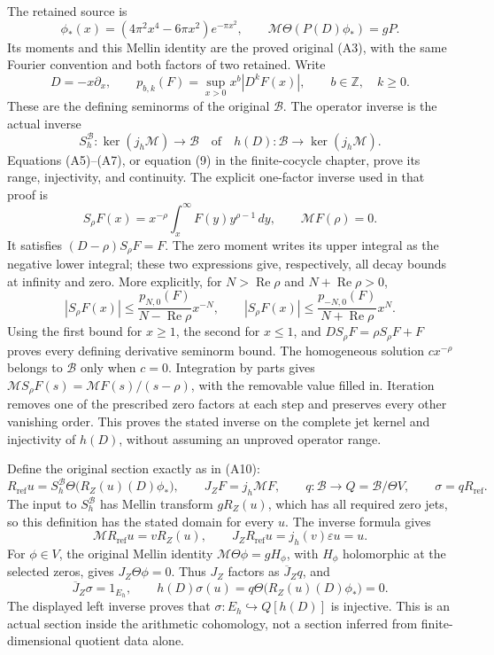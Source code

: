 \documentclass[10pt,a4paper,oneside]{report}
\begin{document}
The retained source is
\[
 \phi_*(x)=(4\pi^2x^4-6\pi x^2)e^{-\pi x^2},\qquad
 \mathcal M\Theta(P(D)\phi_*)=gP.
\]
Its moments and this Mellin identity are the proved original (A3), with
the same Fourier convention and both factors of two retained. Write
\[
 D=-x\partial_x,\qquad
 p_{b,k}(F)=\sup_{x>0}x^b|D^kF(x)|,
 \qquad b\in\mathbb Z,\quad k\geq0.
\]
These are the defining seminorms of the original \(\mathscr B\).
The operator inverse is the actual inverse
\[
 S_h^{\mathscr B}:\ker(j_h\mathcal M)\longrightarrow\mathscr B
 \quad\text{of}\quad h(D):\mathscr B\longrightarrow\ker(j_h\mathcal M).
\]
Equations (A5)--(A7), or equation (9) in the finite-cocycle chapter, prove
its range, injectivity, and continuity. The explicit one-factor inverse
used in that proof is
\[
 S_\rho F(x)=x^{-\rho}\int_x^\infty F(y)y^{\rho-1}\,dy,
 \qquad \mathcal MF(\rho)=0.
\]
It satisfies \((D-\rho)S_\rho F=F\). The zero moment writes its upper
integral as the negative lower integral; these two expressions give,
respectively, all decay bounds at infinity and zero. More explicitly,
for \(N>\operatorname{Re}\rho\) and \(N+\operatorname{Re}\rho>0\),
\[
 |S_\rho F(x)|\leq
 \frac{p_{N,0}(F)}{N-\operatorname{Re}\rho}x^{-N},\qquad
 |S_\rho F(x)|\leq
 \frac{p_{-N,0}(F)}{N+\operatorname{Re}\rho}x^N.
\]
Using the first bound for \(x\geq1\), the second for \(x\leq1\), and
\(DS_\rho F=\rho S_\rho F+F\) proves every defining derivative seminorm
bound. The homogeneous solution \(cx^{-\rho}\) belongs to \(\mathscr B\)
only when \(c=0\). Integration by parts gives
\(\mathcal MS_\rho F(s)=\mathcal MF(s)/(s-\rho)\), with the removable
value filled in. Iteration removes one of the prescribed zero factors
at each step and preserves every other vanishing order. This proves the
stated inverse on the complete jet kernel and injectivity of \(h(D)\),
without assuming an unproved operator range.

Define the original section exactly as in (A10):
\[
 R_{\mathrm{ref}}u
 =S_h^{\mathscr B}\Theta\bigl(R_Z(u)(D)\phi_*\bigr),\qquad
 J_ZF=j_h\mathcal MF,\qquad
 q:\mathscr B\longrightarrow Q=\mathscr B/\Theta V,
 \qquad \sigma=qR_{\mathrm{ref}}.
\]
The input to \(S_h^{\mathscr B}\) has Mellin transform \(gR_Z(u)\),
which has all required zero jets, so this definition has the stated
domain for every \(u\). The inverse formula gives
\[
 \mathcal MR_{\mathrm{ref}}u=vR_Z(u),\qquad
 J_ZR_{\mathrm{ref}}u=j_h(v)\varepsilon u=u.
\]
For \(\phi\in V\), the original Mellin identity
\(\mathcal M\Theta\phi=gH_\phi\), with \(H_\phi\) holomorphic at the
selected zeros, gives \(J_Z\Theta\phi=0\). Thus \(J_Z\) factors as
\(\overline J_Zq\), and
\[
 \overline J_Z\sigma=1_{E_h},\qquad
 h(D)\sigma(u)=q\Theta\bigl(R_Z(u)(D)\phi_*\bigr)=0.
\]
The displayed left inverse proves that
\(\sigma:E_h\hookrightarrow Q[h(D)]\) is injective. This is an actual
section inside the arithmetic cohomology, not a section inferred from
finite-dimensional quotient data alone.
\end{document}
